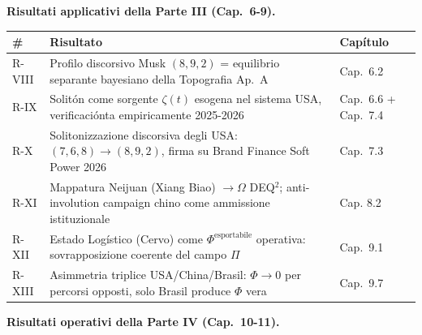 \Proved{} \textbf{Risultati applicativi della Parte III (Cap.~6-9).}

{\def\LTcaptype{none} %
{\small\begin{longtable}[]{@{}
  >{\raggedright\arraybackslash}p{}
  >{\raggedright\arraybackslash}p{}
  >{\raggedright\arraybackslash}p{}@{}}
\toprule\noalign{}
\begin{minipage}[b]{\linewidth}\raggedright
\#
\end{minipage} & \begin{minipage}[b]{\linewidth}\raggedright
Risultato
\end{minipage} & \begin{minipage}[b]{\linewidth}\raggedright
Capítulo
\end{minipage} \\
\midrule\noalign{}
\endhead
\bottomrule\noalign{}
\endlastfoot
R-VIII & Profilo discorsivo Musk \((8, 9, 2)\) = equilibrio separante
bayesiano della Topografia Ap.~A & Cap.~6.2 \\
R-IX & Solitón come sorgente \(\zeta(t)\) esogena nel sistema USA,
verificaciónta empiricamente 2025-2026 & Cap.~6.6 + Cap.~7.4 \\
R-X & Solitonizzazione discorsiva degli USA: \((7,6,8) \to (8,9,2)\),
firma su Brand Finance Soft Power 2026 & Cap.~7.3 \\
R-XI & Mappatura Neijuan (Xiang Biao) \(\to \Omega\) DEQ$^2$;
anti-involution campaign chino come ammissione istituzionale & Cap.
8.2 \\
R-XII & Estado Logístico (Cervo) come \(\Phi^{\text{esportabile}}\)
operativa: sovrapposizione coerente del campo \(\Pi\) & Cap.~9.1 \\
R-XIII & Asimmetria triplice USA/China/Brasil: \(\Phi \to 0\) per
percorsi opposti, solo Brasil produce \(\Phi\) vera & Cap.~9.7 \\
\end{longtable}}
}

\Proved{} \textbf{Risultati operativi della Parte IV (Cap.~10-11).}

